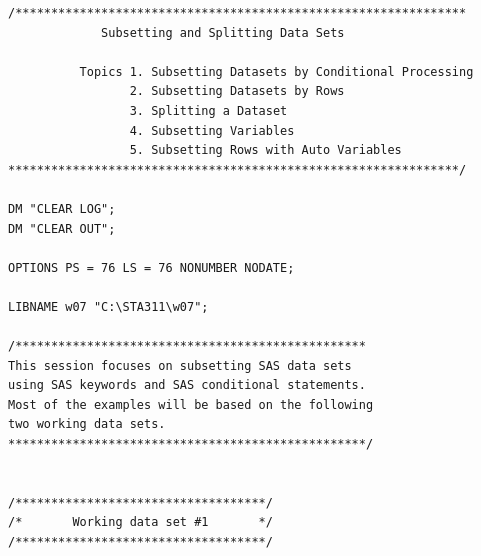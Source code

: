\documentclass[
]{book}
\begin{document}
\begin{verbatim}
/***************************************************************
             Subsetting and Splitting Data Sets

          Topics 1. Subsetting Datasets by Conditional Processing
                 2. Subsetting Datasets by Rows
                 3. Splitting a Dataset
                 4. Subsetting Variables
                 5. Subsetting Rows with Auto Variables
***************************************************************/

DM "CLEAR LOG";
DM "CLEAR OUT";

OPTIONS PS = 76 LS = 76 NONUMBER NODATE;

LIBNAME w07 "C:\STA311\w07";

/*************************************************
This session focuses on subsetting SAS data sets
using SAS keywords and SAS conditional statements. 
Most of the examples will be based on the following 
two working data sets.
**************************************************/


/***********************************/
/*       Working data set #1       */
/***********************************/


\end{verbatim}
\end{document}
